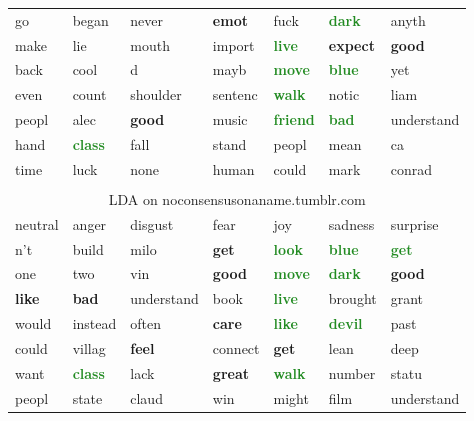 \documentclass{article}
\begin{document}
\begin{table}
\begin{tabular}{ l l l l l l l  }
go & began & never & \textcolor{BrickRed}{\textbf{emot}} & fuck & \textcolor{ForestGreen}{\textbf{dark}} & anyth \\
make & lie & mouth & import & \textcolor{ForestGreen}{\textbf{live}} & \textcolor{BrickRed}{\textbf{expect}} & \textcolor{BrickRed}{\textbf{good}} \\
back & cool & d & mayb & \textcolor{ForestGreen}{\textbf{move}} & \textcolor{ForestGreen}{\textbf{blue}} & yet \\
even & count & shoulder & sentenc & \textcolor{ForestGreen}{\textbf{walk}} & notic & liam \\
peopl & alec & \textcolor{BrickRed}{\textbf{good}} & music & \textcolor{ForestGreen}{\textbf{friend}} & \textcolor{ForestGreen}{\textbf{bad}} & understand \\
hand & \textcolor{ForestGreen}{\textbf{class}} & fall & stand & peopl & mean & ca \\
time & luck & none & human & could & mark & conrad \\
\multicolumn{7}{c}{ } \\
\multicolumn{7}{c}{ \sc LDA on noconsensusonaname.tumblr.com }\\
\sc neutral & \sc anger & \sc disgust & \sc fear & \sc joy & \sc sadness & \sc surprise \\
\hline
n't & build & milo & \textcolor{BrickRed}{\textbf{get}} & \textcolor{ForestGreen}{\textbf{look}} & \textcolor{ForestGreen}{\textbf{blue}} & \textcolor{ForestGreen}{\textbf{get}} \\
one & two & vin & \textcolor{BrickRed}{\textbf{good}} & \textcolor{ForestGreen}{\textbf{move}} & \textcolor{ForestGreen}{\textbf{dark}} & \textcolor{BrickRed}{\textbf{good}} \\
\textcolor{BrickRed}{\textbf{like}} & \textcolor{BrickRed}{\textbf{bad}} & understand & book & \textcolor{ForestGreen}{\textbf{live}} & brought & grant \\
would & instead & often & \textcolor{BrickRed}{\textbf{care}} & \textcolor{ForestGreen}{\textbf{like}} & \textcolor{ForestGreen}{\textbf{devil}} & past \\
could & villag & \textcolor{BrickRed}{\textbf{feel}} & connect & \textcolor{BrickRed}{\textbf{get}} & lean & deep \\
want & \textcolor{ForestGreen}{\textbf{class}} & lack & \textcolor{BrickRed}{\textbf{great}} & \textcolor{ForestGreen}{\textbf{walk}} & number & statu \\
peopl & state & claud & win & might & film & understand \\

\end{tabular}
\end{table}
\end{document}
